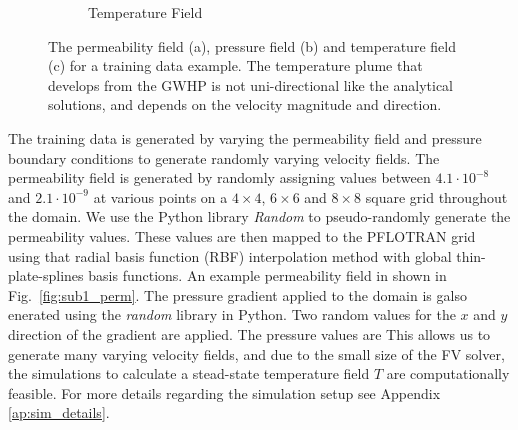 \documentclass{article} %
\begin{document}
\begin{figure}[!htb]
\begin{subfigure}{.33\textwidth}
  \caption{Temperature Field}
  \label{fig:sub1_temp}
\end{subfigure}%
\caption{The permeability field (a), pressure field (b) and temperature field (c) for a training data example. The temperature plume that develops from the GWHP is not uni-directional like the analytical solutions, and depends on the velocity magnitude and direction.}
\label{fig:data_example}
\end{figure}




The training data is generated by varying the permeability field and pressure boundary conditions to generate randomly varying velocity fields.
The permeability field is generated by randomly assigning values between $4.1 \cdot 10^{-8}$ and $2.1 \cdot 10^{-9}$ at various points on a $4 \times 4$, $6 \times 6$ and $8 \times 8$ square grid throughout the domain. We use the Python library \textit{Random} to pseudo-randomly generate the permeability values. These values are then mapped to the PFLOTRAN grid using that radial basis function (RBF) interpolation method with global thin-plate-splines basis functions.
An example permeability field in shown in Fig.~\ref{fig:sub1_perm}.
The pressure gradient applied to the domain is galso enerated using the \textit{random} library in Python. Two random values for the $x$ and $y$ direction of the gradient are applied. The pressure values are 
This allows us to generate many varying velocity fields, and due to the small size of the FV solver, the simulations to calculate a stead-state temperature field $T$ are computationally feasible.
For more details regarding the simulation setup see Appendix \ref{ap:sim_details}.
\end{document}
